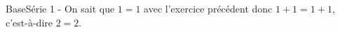     \partie
    BaseSérie 1 - On sait que $1=1$ avec l’exercice précédent donc $1+1=1+1$,
    c’est-à-dire $2=2$.

    \partie
